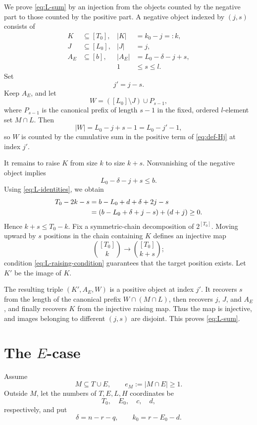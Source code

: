 \documentclass[11pt]{article}
\newcommand{\1}{\mathbf 1}
\begin{document}
We prove \eqref{eq:L-sum} by an injection from the objects counted by
the negative part to those counted by the positive part.  A negative
object indexed by $(j,s)$ consists of
\[
\begin{aligned}
K&\subseteq[T_0],& |K|&=k_0-j=:k,\\
J&\subseteq[L_0],& |J|&=j,\\
A_E&\subseteq[b],& |A_E|&=L_0-\delta-j+s,\\
&&1&\leq s\leq l.
\end{aligned}
\]
Set
\[
j'=j-s.
\]
Keep $A_E$, and let
\begin{equation}\label{eq:L-W-map}
W=([L_0]\setminus J)\cup P_{s-1},
\end{equation}
where $P_{s-1}$ is the canonical prefix of length $s-1$ in the fixed,
ordered $l$-element set $M\cap L$.  Then
\[
|W|=L_0-j+s-1=L_0-j'-1,
\]
so $W$ is counted by the cumulative sum in the positive term of
\eqref{eq:def-Hj} at index $j'$.

It remains to raise $K$ from size $k$ to size $k+s$.  Nonvanishing of
the negative object implies
\[
L_0-\delta-j+s\leq b.
\]
Using \eqref{eq:L-identities}, we obtain
\begin{align}
T_0-2k-s
&=b-L_0+d+\delta+2j-s\notag\\
&=(b-L_0+\delta+j-s)+(d+j)\geq0.
\label{eq:L-raising-condition}
\end{align}
Hence $k+s\leq T_0-k$.  Fix a symmetric-chain decomposition of
$2^{[T_0]}$.  Moving upward by $s$ positions in the chain containing
$K$ defines an injective map
\[
\binom{[T_0]}k\longrightarrow\binom{[T_0]}{k+s};
\]
condition \eqref{eq:L-raising-condition} guarantees that the target
position exists.  Let $K'$ be the image of $K$.

The resulting triple $(K',A_E,W)$ is a positive object at index $j'$.
It recovers $s$ from the length of the canonical prefix
$W\cap(M\cap L)$, then recovers $j$, $J$, and $A_E$, and finally
recovers $K$ from the injective raising map.  Thus the map is
injective, and images belonging to different $(j,s)$ are disjoint.
This proves \eqref{eq:L-sum}.

\section{The $E$-case}

Assume
\[
M\subseteq T\cup E,
\qquad
e_M:=|M\cap E|\geq1.
\]
Outside $M$, let the numbers of $T,E,L,H$ coordinates be
\[
T_0,\quad E_0,\quad c,\quad d,
\]
respectively, and put
\[
\delta=n-r-q,
\qquad
k_0=r-E_0-d.
\]
\end{document}
